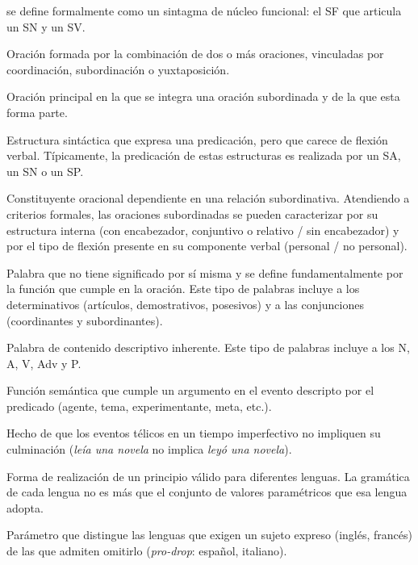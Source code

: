 \begin{glosariogeneral}
        se define formalmente como un sintagma de núcleo funcional: el SF que
        articula un SN y un SV.
  \item[Oración compuesta:] Oración formada por la combinación de dos o más
        oraciones, vinculadas por coordinación, subordinación o yuxtaposición.
  \item[Oración matriz:] Oración principal en la que se integra una oración
        subordinada y de la que esta forma parte.
  \item[Oración reducida:] Estructura sintáctica que expresa una predicación,
        pero que carece de flexión verbal. Típicamente, la predicación de estas
        estructuras es realizada por un SA, un SN o un SP.
  \item[Oración subordinada:] Constituyente oracional dependiente en una
        relación subordinativa. Atendiendo a criterios formales, las oraciones
        subordinadas se pueden caracterizar por su estructura interna (con
        encabezador, conjuntivo o relativo / sin encabezador) y por el tipo de
        flexión presente en su componente verbal (personal / no personal).
  \item[Palabra funcional o gramatical:] Palabra que no tiene significado por sí
        misma y se define fundamentalmente por la función que cumple en la
        oración. Este tipo de palabras incluye a los determinativos (artículos,
        demostrativos, posesivos) y a las conjunciones (coordinantes y
        subordinantes).
  \item[Palabra léxica:] Palabra de contenido descriptivo inherente. Este tipo
        de palabras incluye a los N, A, V, Adv y P.
  \item[Papel temático:] Función semántica que cumple un argumento en el
        evento descripto por el predicado (agente, tema, experimentante, meta,
        etc.).
  \item[Paradoja imperfectiva:] Hecho de que los eventos télicos en un tiempo
        imperfectivo no impliquen su culminación (\textit{leía una novela} no
        implica \textit{leyó una novela}).
  \item[Parámetro:] Forma de realización de un principio válido para diferentes
        lenguas. La gramática de cada lengua no es más que el conjunto de
        valores paramétricos que esa lengua adopta.
  \item[Parámetro del sujeto nulo:] Parámetro que distingue las lenguas que
        exigen un sujeto expreso (inglés, francés) de las que admiten omitirlo
        (\textit{pro-drop}: español, italiano).

\end{glosariogeneral}
